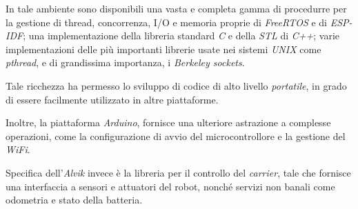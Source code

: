 In tale ambiente sono disponibili una vasta e completa gamma di procedurre per la gestione di thread,
concorrenza, I/O e memoria proprie di \textit{FreeRTOS} e di \textit{ESP-IDF};
una implementazione della libreria standard \textit{C} e della \textit{STL} di \textit{C++};
varie implementazioni delle più importanti librerie usate nei sistemi \textit{UNIX} 
come \textit{pthread}, e di grandissima importanza, i \textit{Berkeley sockets}.
\medskip

Tale ricchezza ha permesso lo sviluppo di codice di alto livello \textit{portatile}, in grado
di essere facilmente utilizzato in altre piattaforme.
\medskip

Inoltre, la piattaforma \textit{Arduino}, fornisce una ulteriore astrazione a complesse operazioni,
come la configurazione di avvio del microcontrollore e la gestione del \textit{WiFi}.
\medskip

Specifica dell'\textit{Alvik} invece è la libreria per il controllo del \textit{carrier},
tale che fornisce una interfaccia a sensori e attuatori del robot, nonché servizi non banali
come odometria e stato della batteria.
\medskip






%
%